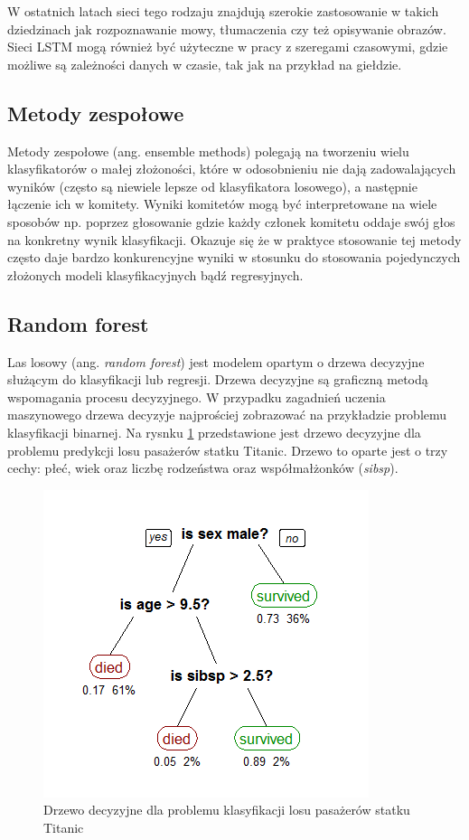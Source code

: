 \documentclass[a4paper, twoside, 11pt, openright]{article}
\begin{document}
\bigskip

W ostatnich latach sieci tego rodzaju znajdują szerokie zastosowanie w takich dziedzinach jak rozpoznawanie mowy, tłumaczenia czy też opisywanie obrazów. Sieci LSTM mogą również być użyteczne w pracy z szeregami czasowymi, gdzie możliwe są zależności danych w czasie, tak jak na przykład na 
giełdzie. 

\subsection{Metody zespołowe}

Metody zespołowe (ang. ensemble methods) polegają na tworzeniu wielu klasyfikatorów o małej złożoności, które w odosobnieniu nie dają zadowalających wyników (często są niewiele lepsze od klasyfikatora losowego), a następnie łączenie ich w komitety. Wyniki komitetów mogą być interpretowane na wiele sposobów np. poprzez głosowanie gdzie każdy członek komitetu oddaje swój głos na konkretny wynik klasyfikacji. Okazuje się że w praktyce stosowanie tej metody często daje bardzo konkurencyjne wyniki w stosunku do stosowania pojedynczych złożonych modeli klasyfikacyjnych bądź regresyjnych.

\subsection{Random forest \cite{randforest}}

Las losowy (ang. \textit{random forest}) jest modelem opartym o drzewa decyzyjne służącym do klasyfikacji lub regresji. Drzewa decyzyjne są graficzną metodą wspomagania procesu decyzyjnego. W przypadku zagadnień uczenia maszynowego drzewa decyzyje najprościej zobrazować na przykładzie problemu klasyfikacji binarnej. Na rysnku \ref{wiki_dec_tree} przedstawione jest drzewo decyzyjne dla problemu predykcji losu pasażerów statku Titanic. Drzewo to oparte jest o trzy cechy: płeć, wiek oraz liczbę rodzeństwa oraz współmałżonków (\textit{sibsp}). 

\begin{figure}[H]
\centering \includegraphics[scale=0.6]{img/decision_tree.png}
\caption{Drzewo decyzyjne dla problemu klasyfikacji losu pasażerów statku Titanic \cite{wikidecisiontree}}
\label{wiki_dec_tree}
\end{figure}
\end{document}
